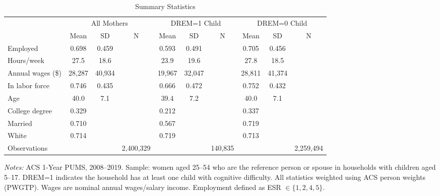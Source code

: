 \begin{table}[H]
\centering
\caption{Summary Statistics}
\begin{threeparttable}
\footnotesize
\begin{tabular}{l ccc ccc ccc}
\toprule
 & \multicolumn{3}{c}{All Mothers} & \multicolumn{3}{c}{DREM=1 Child} & \multicolumn{3}{c}{DREM=0 Child} \\
\cmidrule(lr){2-4} \cmidrule(lr){5-7} \cmidrule(lr){8-10}
 & Mean & SD & N & Mean & SD & N & Mean & SD & N \\
\midrule
Employed & 0.698 & 0.459 & & 0.593 & 0.491 & & 0.705 & 0.456 & \\
Hours/week & 27.5 & 18.6 & & 23.9 & 19.6 & & 27.8 & 18.5 & \\
Annual wages (\$) & 28,287 & 40,934 & & 19,967 & 32,047 & & 28,811 & 41,374 & \\
In labor force & 0.746 & 0.435 & & 0.666 & 0.472 & & 0.752 & 0.432 & \\
Age & 40.0 & 7.1 & & 39.4 & 7.2 & & 40.0 & 7.1 & \\
College degree & 0.329 & & & 0.212 & & & 0.337 & & \\
Married & 0.710 & & & 0.567 & & & 0.719 & & \\
White & 0.714 & & & 0.719 & & & 0.713 & & \\
\midrule
Observations & & & 2,400,329 & & & 140,835 & & & 2,259,494 \\
\bottomrule
\end{tabular}
\begin{tablenotes}[flushleft]
\small
\item \textit{Notes:} ACS 1-Year PUMS, 2008--2019. Sample: women aged 25--54 who are the reference person or spouse in households with children aged 5--17. DREM=1 indicates the household has at least one child with cognitive difficulty. All statistics weighted using ACS person weights (PWGTP). Wages are nominal annual wages/salary income. Employment defined as ESR $\in \{1,2,4,5\}$.
\end{tablenotes}
\end{threeparttable}
\label{tab:summary}
\end{table}

